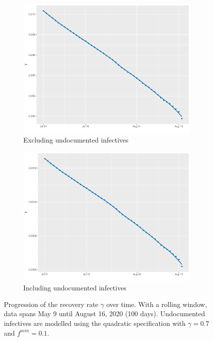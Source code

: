 \documentclass[12pt]{article}
\begin{document}
\begin{appendices}
		\begin{figure}[H]
    	    \centering
    	    \begin{subfigure}{0.495\textwidth}
    	      \centering
    	      \includegraphics[width=\linewidth]{output/panel_data_lag14_gammas_rolling.pdf}
    	      \caption{Excluding undocumented infectives}
    	      \label{fig:gamma_over_time_panel_data}
    	    \end{subfigure}
    	    \begin{subfigure}{0.495\textwidth}
    	      \centering
    	      \includegraphics[width=\linewidth]{output/panel_data_lag14_gammas_UndocQuadratic_rolling.pdf}
    	      \caption{Including undocumented infectives}
    	      \label{fig:gamma_over_time_panel_data_undoc_rolling}
    	    \end{subfigure}
    	    \caption{Progression of the recovery rate $\gamma$ over time. With a rolling window, data spans May 9 until August 16, 2020 (100 days). Undocumented infectives are modelled using the quadratic specification with $\gamma = 0.7$ and $f^{min}=0.1$.}
    	    \label{fig:gamma_over_time_panel_data_all}
    	\end{figure}
		

\end{appendices}
\end{document}
